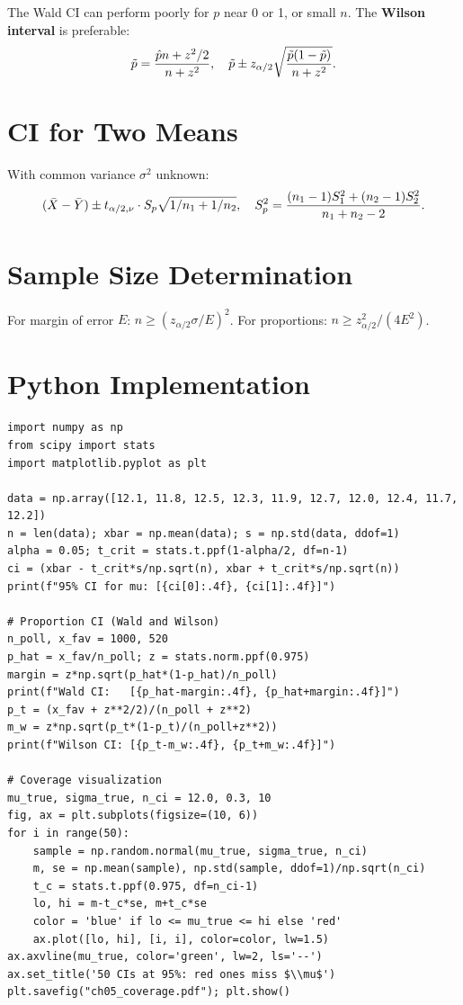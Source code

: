 \begin{warning}
The Wald CI can perform poorly for $p$ near 0 or 1, or small $n$. The \textbf{Wilson interval} is preferable:
\[
\tilde{p} = \frac{\hat{p} n + z^2/2}{n+z^2}, \quad \tilde{p}\pm z_{\alpha/2}\sqrt{\frac{\tilde{p}(1-\tilde{p})}{n+z^2}}.
\]
\end{warning}

\section{CI for Two Means}

With common variance $\sigma^2$ unknown:
\[
(\bar{X}-\bar{Y}) \pm t_{\alpha/2,\nu}\cdot S_p\sqrt{1/n_1+1/n_2}, \quad S_p^2=\frac{(n_1-1)S_1^2+(n_2-1)S_2^2}{n_1+n_2-2}.
\]

\section{Sample Size Determination}

For margin of error $E$: $n\geq(z_{\alpha/2}\sigma/E)^2$. For proportions: $n\geq z_{\alpha/2}^2/(4E^2)$.

\section{Python Implementation}

\begin{python}
\begin{verbatim}
import numpy as np
from scipy import stats
import matplotlib.pyplot as plt

data = np.array([12.1, 11.8, 12.5, 12.3, 11.9, 12.7, 12.0, 12.4, 11.7, 12.2])
n = len(data); xbar = np.mean(data); s = np.std(data, ddof=1)
alpha = 0.05; t_crit = stats.t.ppf(1-alpha/2, df=n-1)
ci = (xbar - t_crit*s/np.sqrt(n), xbar + t_crit*s/np.sqrt(n))
print(f"95% CI for mu: [{ci[0]:.4f}, {ci[1]:.4f}]")

# Proportion CI (Wald and Wilson)
n_poll, x_fav = 1000, 520
p_hat = x_fav/n_poll; z = stats.norm.ppf(0.975)
margin = z*np.sqrt(p_hat*(1-p_hat)/n_poll)
print(f"Wald CI:   [{p_hat-margin:.4f}, {p_hat+margin:.4f}]")
p_t = (x_fav + z**2/2)/(n_poll + z**2)
m_w = z*np.sqrt(p_t*(1-p_t)/(n_poll+z**2))
print(f"Wilson CI: [{p_t-m_w:.4f}, {p_t+m_w:.4f}]")

# Coverage visualization
mu_true, sigma_true, n_ci = 12.0, 0.3, 10
fig, ax = plt.subplots(figsize=(10, 6))
for i in range(50):
    sample = np.random.normal(mu_true, sigma_true, n_ci)
    m, se = np.mean(sample), np.std(sample, ddof=1)/np.sqrt(n_ci)
    t_c = stats.t.ppf(0.975, df=n_ci-1)
    lo, hi = m-t_c*se, m+t_c*se
    color = 'blue' if lo <= mu_true <= hi else 'red'
    ax.plot([lo, hi], [i, i], color=color, lw=1.5)
ax.axvline(mu_true, color='green', lw=2, ls='--')
ax.set_title('50 CIs at 95%: red ones miss $\\mu$')
plt.savefig("ch05_coverage.pdf"); plt.show()
\end{verbatim}
\end{python}

